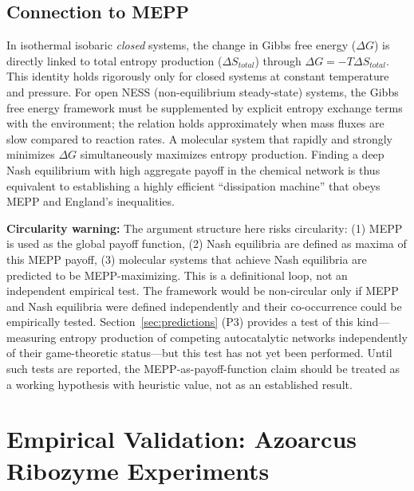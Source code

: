 \documentclass[12pt,a4paper]{article}
\theoremstyle{remark}
\begin{document}
\subsection{Connection to MEPP}

In isothermal isobaric \emph{closed} systems, the change in Gibbs free energy ($\Delta G$) is directly linked to total entropy production ($\Delta S_{total}$) through $\Delta G = -T\Delta S_{total}$. This identity holds rigorously only for closed systems at constant temperature and pressure. For open NESS (non-equilibrium steady-state) systems, the Gibbs free energy framework must be supplemented by explicit entropy exchange terms with the environment; the relation holds approximately when mass fluxes are slow compared to reaction rates. A molecular system that rapidly and strongly minimizes $\Delta G$ simultaneously maximizes entropy production. Finding a deep Nash equilibrium with high aggregate payoff in the chemical network is thus equivalent to establishing a highly efficient ``dissipation machine'' that obeys MEPP and England's inequalities.

\textbf{Circularity warning:} The argument structure here risks circularity: (1) MEPP is used as the global payoff function, (2) Nash equilibria are defined as maxima of this MEPP payoff, (3) molecular systems that achieve Nash equilibria are predicted to be MEPP-maximizing. This is a definitional loop, not an independent empirical test. The framework would be non-circular only if MEPP and Nash equilibria were defined independently and their co-occurrence could be empirically tested. Section~\ref{sec:predictions} (P3) provides a test of this kind---measuring entropy production of competing autocatalytic networks independently of their game-theoretic status---but this test has not yet been performed. Until such tests are reported, the MEPP-as-payoff-function claim should be treated as a working hypothesis with heuristic value, not as an established result.

\section{Empirical Validation: Azoarcus Ribozyme Experiments}
\label{sec:azoarcus}
\end{document}
